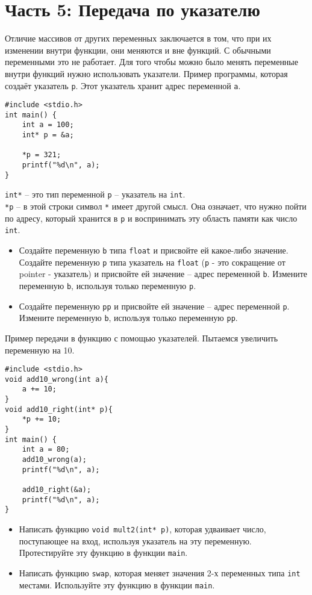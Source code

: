 \documentclass{article}
\begin{document}
\section*{Часть 5: Передача по указателю}
Отличие массивов от других переменных заключается в том, что при их изменении внутри функции, они меняются и вне функций. С обычными переменными это не работает. Для того чтобы можно было менять переменные внутри функций нужно использовать указатели.
Пример программы, которая создаёт указатель \texttt{p}. Этот указатель хранит адрес переменной \texttt{a}.
\begin{lstlisting}
#include <stdio.h>
int main() {
    int a = 100;
    int* p = &a;
	
    *p = 321;
    printf("%d\n", a);     
}
\end{lstlisting}
\texttt{int*} -- это тип переменной \texttt{p} -- указатель на \texttt{int}. \\
\texttt{*p} -- в этой строки символ \texttt{*} имеет другой смысл. Она означает, что нужно пойти по адресу, который хранится в \texttt{p} и воспринимать эту область памяти как число \texttt{int}.

\begin{itemize}
\item Создайте переменную \texttt{b} типа \texttt{float} и присвойте ей какое-либо значение. Создайте переменную \texttt{p} типа указатель на \texttt{float} (\texttt{p} - это сокращение от pointer - указатель)  и присвойте ей значение -- адрес переменной \texttt{b}. Измените переменную \texttt{b}, используя только переменную \texttt{p}.
\item Создайте переменную \texttt{pp} и присвойте ей значение -- адрес переменной \texttt{p}. Измените переменную \texttt{b}, используя только переменную \texttt{pp}.
\end{itemize}

Пример передачи в функцию с помощью указателей. Пытаемся увеличить переменную на 10.
\begin{lstlisting}
#include <stdio.h>
void add10_wrong(int a){
    a += 10;
}
void add10_right(int* p){
    *p += 10;
}
int main() {
    int a = 80;
    add10_wrong(a);
    printf("%d\n", a); 
	    
    add10_right(&a);
    printf("%d\n", a); 
}
\end{lstlisting}

\begin{itemize}
\item Написать функцию \texttt{void mult2(int* p)}, которая удваивает число, поступающее на вход, используя указатель на эту переменную. Протестируйте эту функцию в функции \texttt{main}.
\item Написать функцию \texttt{swap}, которая меняет значения 2-х переменных типа \texttt{int} местами. Используйте эту функцию в функции \texttt{main}.
\end{itemize}
\end{document}
